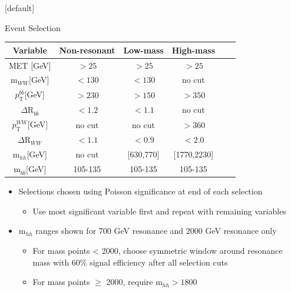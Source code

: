 \documentclass{beamer}
\newcommand*{\mww}{\ensuremath{\text{m}_{WW}}\xspace}
\newcommand*{\mhh}{\ensuremath{\text{m}_{hh}}\xspace}
\newcommand*{\ptbb}{\ensuremath{p_{\text{T}}^{b\bar{b}}}\xspace}
\newcommand*{\ptww}{\ensuremath{p_{\text{T}}^{WW}}\xspace}
\newcommand*{\mbb}{\ensuremath{\text{m}_{b\bar{b}}}\xspace}
\newcommand*{\drbb}{\ensuremath{\Delta\text{R}_{b\bar{b}}}\xspace}
\newcommand*{\drww}{\ensuremath{\Delta\text{R}_{WW}}\xspace}
\begin{document}
{  \makeatletter %
  [default]
  \def\beamer@entrycode{\vspace*{-1.075\headheight}}
  \begin{frame}{Event Selection}
    \begin{table}
      \begin{center}
        \begin{tabular}{|c|c|c|c|c|c}
          \hline 
          Variable 			& Non-resonant 	 & Low-mass 	& High-mass\\
          \hline
          MET [GeV]			& $> 25 $	 & $> 25 $	& $> 25 $\\
          \mww [GeV]   		& $<130$ 	 &$<130$ 	& no cut \\
          \ptbb [GeV] 	& $>230$ 	 & $>150$ 	&$>350$\\
          \drbb  			& $<1.2$ 	 & $<1.1$ 	& no cut  \\
          \ptww [GeV] 	& no cut	 & no cut   	& $>360$ \\
          \drww  		& $<1.1$ 	 & $<0.9$ 	& $<2.0$ \\
          \mhh [GeV]  		& no cut 	 & [630,770]	& [1770,2230]\\
          \mbb [GeV]   			& 105-135 	 & 105-135 	& 105-135\\
          \hline
        \end{tabular}
      \end{center}
    \end{table}
    \begin{itemize}\small
    \item Selections chosen using Poisson significance at end of each selection
      \begin{itemize}\scriptsize
      \item Use most significant variable first and repeat with remaining variables
      \end{itemize}
    \item m$_{hh}$ ranges shown for 700 GeV resonance and 2000 GeV resonance only
      \begin{itemize}\scriptsize
      \item For mass points < 2000, choose symmetric window around resonance mass with 60\% signal efficiency after all selection cuts
      \item For mass points $\geq$ 2000, require m$_{hh} > 1800$
      \end{itemize}
    \end{itemize}
  \end{frame}
  
}
\end{document}
